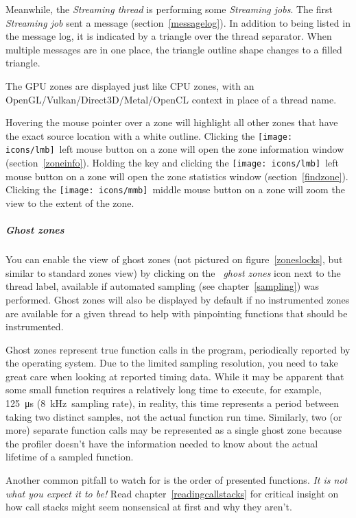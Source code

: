 \documentclass[hidelinks,titlepage,a4paper,twoside]{article}
\newcommand{\LMB}{\texttt{[image: icons/lmb]}}
\newcommand{\MMB}{\texttt{[image: icons/mmb]}}
\begin{document}
Meanwhile, the \emph{Streaming thread} is performing some \emph{Streaming jobs}. The first \emph{Streaming job} sent a message (section~\ref{messagelog}). In addition to being listed in the message log, it is indicated by a triangle over the thread separator. When multiple messages are in one place, the triangle outline shape changes to a filled triangle.

The GPU zones are displayed just like CPU zones, with an OpenGL/Vulkan/Direct3D/Metal/OpenCL context in place of a thread name.

Hovering the \faMousePointer{} mouse pointer over a zone will highlight all other zones that have the exact source location with a white outline. Clicking the \LMB{}~left mouse button on a zone will open the zone information window (section~\ref{zoneinfo}). Holding the \keys{\ctrl} key and clicking the \LMB{}~left mouse button on a zone will open the zone statistics window (section~\ref{findzone}). Clicking the \MMB{}~middle mouse button on a zone will zoom the view to the extent of the zone.

\subparagraph{Ghost zones}

You can enable the view of ghost zones (not pictured on figure~\ref{zoneslocks}, but similar to standard zones view) by clicking on the \emph{\faGhost{}~ghost zones} icon next to the thread label, available if automated sampling (see chapter~\ref{sampling}) was performed. Ghost zones will also be displayed by default if no instrumented zones are available for a given thread to help with pinpointing functions that should be instrumented.

Ghost zones represent true function calls in the program, periodically reported by the operating system. Due to the limited sampling resolution, you need to take great care when looking at reported timing data. While it may be apparent that some small function requires a relatively long time to execute, for example, 125~\si{\micro\second} (8~kHz~sampling rate), in reality, this time represents a period between taking two distinct samples, not the actual function run time. Similarly, two (or more) separate function calls may be represented as a single ghost zone because the profiler doesn't have the information needed to know about the actual lifetime of a sampled function.

Another common pitfall to watch for is the order of presented functions. \emph{It is not what you expect it to be!} Read chapter~\ref{readingcallstacks} for critical insight on how call stacks might seem nonsensical at first and why they aren't.
\end{document}
